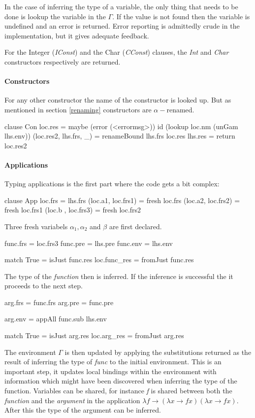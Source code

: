 In the case of inferring the type of a variable, the only thing that needs to be done is lookup the variable in the $\Gamma$. If the value is not found then the variable is undefined and an error is returned. Error reporting is admittedly crude in the implementation, but it gives adequate feedback.

For the Integer (\emph{IConst}) and the Char (\emph{CConst}) clauses, the \emph{Int} and \emph{Char} constructors respectively are returned.

\paragraph{Constructors}
For any other constructor the name of the constructor is looked up. But as mentioned in section \ref{renaming} constructors are $\alpha-$renamed.

\begin{code}
clause Con
   loc.res = maybe (error (<errormsg>)) id (lookup loc.nm (unGam lhs.env))
   (loc.res2, lhs.frs, _) = renameBound lhs.frs loc.res
   lhs.res = return loc.res2
\end{code}

\paragraph{Applications}
Typing applications is the first part where the code gets a bit complex:

\begin{code}
clause App
   loc.frs            = lhs.frs
   (loc.a1, loc.frs1) = fresh loc.frs
   (loc.a2, loc.frs2) = fresh loc.frs1
   (loc.b , loc.frs3) = fresh loc.frs2
\end{code}
Three fresh variabels $\alpha_1, \alpha_2$ and $\beta$ are first declared.

\begin{code}
   func.frs = loc.frs3
   func.pre = lhs.pre
   func.env = lhs.env
       
   match True   = isJust func.res       
   loc.func_res = fromJust func.res
\end{code}
The type of the \emph{function} then is inferred. If the inference is successful the it proceeds to the next step.

\begin{code}       
   arg.frs = func.frs
   arg.pre = func.pre
       
   arg.env = appAll func.sub lhs.env
    
   match True = isJust arg.res   
   loc.arg_res = fromJust arg.res
\end{code}
The environment $\Gamma$ is then updated by applying the substitutions returned as the result of inferring the type of \emph{func} to the initial environment. This is an important step, it updates local bindings within the environment with information which might have been discovered when inferring the type of the function. Variables can be shared, for instance \emph{f} is shared between both the \emph{function} and the \emph{argument} in the application $\lambda f \rightarrow (\lambda x \rightarrow f x) (\lambda x \rightarrow f x)$. After this the type of the argument can be inferred.
       
